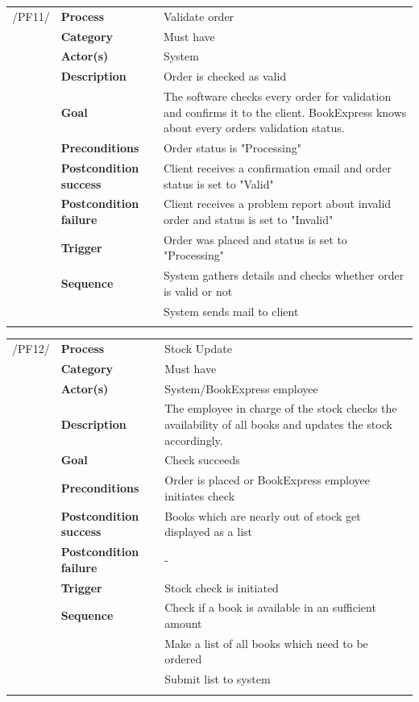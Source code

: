 \documentclass[11pt,a4paper,oneside,svgnames]{report}
\begin{document}
\noindent
\begin{tabular}{p{1.5cm}p{3cm}p{8cm}}
\cellcolor{white}	 /PF11/	& \textbf{Process} & Validate order\\ 
\cellcolor{white}		& \textbf{Category} & Must have\\
\cellcolor{white}		& \textbf{Actor(s)} & System\\ 
\cellcolor{white}		& \textbf{Description}	 & Order is checked as valid\\ 
\cellcolor{white}		& \textbf{Goal} & The software checks every order for validation and confirms it to the client. BookExpress knows about every orders validation status.\\
\cellcolor{white}		& \textbf{Preconditions} & Order status is "Processing"\\
\cellcolor{white}		& \textbf{Postcondition success} & Client receives a confirmation email and order status is set to "Valid"\\
\cellcolor{white}		& \textbf{Postcondition failure} & Client receives a problem report about invalid order and status is set to "Invalid"\\
\cellcolor{white}		& \textbf{Trigger} & Order was placed and status is set to "Processing"\\
\cellcolor{white}		& \textbf{Sequence} & System  gathers details and checks whether order is valid or not\\
\cellcolor{white}		& & System sends mail to client\\
\cellcolor{white}\hfill \\
\end{tabular}

\noindent
\begin{tabular}{p{1.5cm}p{3cm}p{8cm}}
\cellcolor{white}	 /PF12/	& \textbf{Process} & Stock Update\\ 
\cellcolor{white}		& \textbf{Category} & Must have\\
\cellcolor{white}		& \textbf{Actor(s)} & System/BookExpress employee\\ 
\cellcolor{white}		& \textbf{Description}	 & The employee in charge of the stock checks the availability of all books and updates the stock accordingly.\\ 
\cellcolor{white}		& \textbf{Goal} & Check succeeds\\
\cellcolor{white}		& \textbf{Preconditions} & Order is placed or BookExpress employee initiates check\\
\cellcolor{white}		& \textbf{Postcondition success} & Books which are nearly out of stock get displayed as a list\\
\cellcolor{white}		& \textbf{Postcondition failure} & -\\
\cellcolor{white}		& \textbf{Trigger} & Stock check is initiated\\
\cellcolor{white}		& \textbf{Sequence} & Check if a book is available in an sufficient amount\\
\cellcolor{white}		& & Make a list of all books which need to be ordered\\
\cellcolor{white}		& & Submit list to system\\
\cellcolor{white}\hfill \\
\end{tabular}
\end{document}
